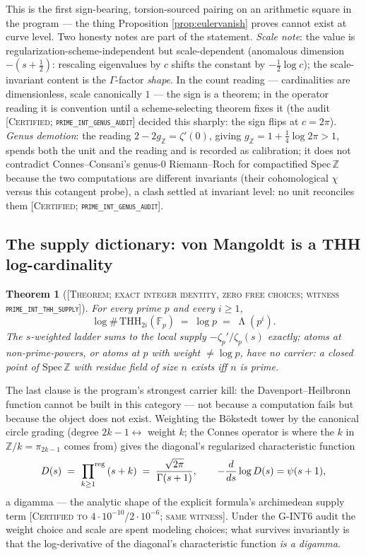 \documentclass[11pt,reqno]{amsart}
\theoremstyle{plain}
\newtheorem{theorem}{Theorem}[section]
\theoremstyle{definition}
\theoremstyle{remark}
\newcommand{\Z}{\mathbb{Z}}
\newcommand{\F}{\mathbb{F}}
\newcommand{\THH}{\mathrm{THH}}
\newcommand{\prodreg}{\sideset{}{^{\mathrm{reg}}}\prod}
\newcommand{\grade}[1]{\textup{[\textsc{#1}]}}
\DeclareMathOperator{\Lam}{\Lambda}
\begin{document}
This is the first sign-bearing, torsion-sourced pairing on an arithmetic square in the
program --- the thing Proposition \ref{prop:eulervanish} proves cannot exist at curve level.
Two honesty notes are part of the statement. \emph{Scale note}: the value is
regularization-scheme-independent but scale-dependent (anomalous dimension $-(s+\tfrac12)$:
rescaling eigenvalues by $c$ shifts the constant by $-\tfrac12\log c$); the scale-invariant
content is the $\Gamma$-factor \emph{shape}. In the count reading --- cardinalities are
dimensionless, scale canonically $1$ --- the sign is a theorem; in the operator reading it is
convention until a scheme-selecting theorem fixes it (the audit
\grade{Certified; \texttt{prime\_\allowbreak int\_\allowbreak genus\_\allowbreak audit}} decided this sharply: the sign flips at
$c = 2\pi$). \emph{Genus demotion}: the reading $2 - 2g_\Z = \zeta'(0)$, giving
$g_\Z = 1 + \tfrac14\log 2\pi > 1$, spends both the unit and the reading and is recorded as
calibration; it does not contradict Connes--Consani's genus-$0$ Riemann--Roch for
compactified $\mathrm{Spec}\,\Z$ \cite{CCRR22} because the two computations are
different invariants (their cohomological $\chi$ versus this cotangent probe), a clash
settled at invariant level: no unit reconciles them
\grade{Certified; \texttt{prime\_\allowbreak int\_\allowbreak genus\_\allowbreak audit}}.

\subsection{The supply dictionary: von Mangoldt is a THH log-cardinality}

\begin{theorem}[\grade{Theorem; exact integer identity, zero free choices;
witness \texttt{prime\_\allowbreak int\_\allowbreak thh\_\allowbreak supply}}]\label{thm:supply}
For every prime $p$ and every $i \ge 1$,
\[
\log \#\,\THH_{2i}(\F_p) \;=\; \log p \;=\; \Lam(p^i).
\]
The $s$-weighted ladder sums to the local supply $-\zeta_p'/\zeta_p(s)$ exactly; atoms at
non-prime-powers, or atoms at $p$ with weight $\ne \log p$, have no carrier: a closed point
of $\mathrm{Spec}\,\Z$ with residue field of size $n$ exists iff $n$ is prime.
\end{theorem}

The last clause is the program's strongest carrier kill: the Davenport--Heilbronn function
cannot be built in this category --- not because a computation fails but because the object
does not exist. Weighting the B\"okstedt tower by the canonical circle grading (degree
$2k-1 \leftrightarrow$ weight $k$; the Connes operator is where the $k$ in
$\Z/k = \pi_{2k-1}$ comes from) gives the diagonal's regularized characteristic function
\[
D(s) \;=\; \prodreg_{k \ge 1}\,(s + k) \;=\; \frac{\sqrt{2\pi}}{\Gamma(s+1)}, \qquad
-\frac{d}{ds}\log D(s) = \psi(s+1),
\]
a digamma --- the analytic shape of the explicit formula's archimedean supply term
\grade{Certified to $4\cdot10^{-10}$/$2\cdot10^{-6}$; same witness}. Under the G-INT6 audit
the weight choice and scale are spent modeling choices; what survives invariantly is that the
log-derivative of the diagonal's characteristic function \emph{is a digamma}.
\end{document}
